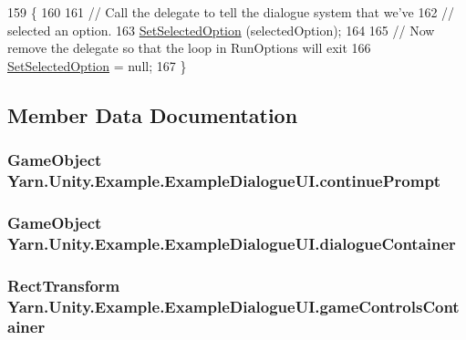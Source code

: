 \begin{DoxyCode}
159         \{
160             
161             \textcolor{comment}{// Call the delegate to tell the dialogue system that we've}
162             \textcolor{comment}{// selected an option.}
163             \hyperlink{a00039_a558f60ef9a7bcf887f015ba0d27aa6ef}{SetSelectedOption} (selectedOption);
164             
165             \textcolor{comment}{// Now remove the delegate so that the loop in RunOptions will exit}
166             \hyperlink{a00039_a558f60ef9a7bcf887f015ba0d27aa6ef}{SetSelectedOption} = null; 
167         \}
\end{DoxyCode}


\subsection{Member Data Documentation}
\hypertarget{a00039_a74367b77a6a5218fa47dbe1d6266e4c6}{
\subsubsection[{continue\-Prompt}]{\setlength{\rightskip}{0pt plus 5cm}Game\-Object Yarn.\-Unity.\-Example.\-Example\-Dialogue\-U\-I.\-continue\-Prompt}}\label{a00039_a74367b77a6a5218fa47dbe1d6266e4c6}
\hypertarget{a00039_a2eaebc844d2ca982ec078708d070dbd3}{
\subsubsection[{dialogue\-Container}]{\setlength{\rightskip}{0pt plus 5cm}Game\-Object Yarn.\-Unity.\-Example.\-Example\-Dialogue\-U\-I.\-dialogue\-Container}}\label{a00039_a2eaebc844d2ca982ec078708d070dbd3}
\hypertarget{a00039_a8344106eb22a0ad00e2400c2941b3e5f}{
\subsubsection[{game\-Controls\-Container}]{\setlength{\rightskip}{0pt plus 5cm}Rect\-Transform Yarn.\-Unity.\-Example.\-Example\-Dialogue\-U\-I.\-game\-Controls\-Container}}\label{a00039_a8344106eb22a0ad00e2400c2941b3e5f}
